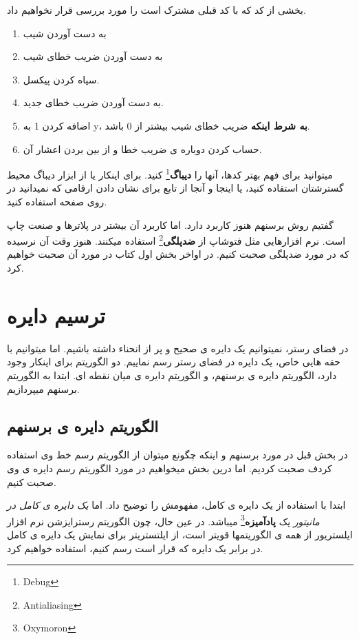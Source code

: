 \documentclass[14pt,a4paper]{memoir}
\begin{document}
	 
	 بخشی از کد که با کد قبلی مشترک است را مورد بررسی قرار نخواهیم داد.
	 
	\begin{enumerate}[label=(\Roman*)]
	\item  به دست آوردن شیب
	\item به دست آوردن ضریب خطای شیب
	\item سیاه کردن پیکسل.
	\item به دست آوردن ضریب خطای جدید.
	\item  اضافه کردن 1 به y، \textbf{به شرط اینکه} ضریب خطای شیب بیشتر از 0 باشد.
	\item  حساب کردن دوباره ی ضریب خطا و از بین بردن اعشار آن.
\end{enumerate}
	 
	 
	 \begin{tip}
	 	میتوانید برای فهم بهتر کدها، آنها را \textbf{دیباگ}\footnote{Debug} کنید. برای اینکار یا از ابزار دیباگ محیط گسترشتان استفاده کنید، یا اینجا و آنجا از تابع  برای نشان دادن ارقامی که نمیدانید در روی صفحه استفاده کنید.
	 \end{tip}
	 
	 
	 گفتیم روش برسنهم هنوز کاربرد دارد. اما کاربرد آن بیشتر در پلاترها و صنعت چاپ است. نرم افزارهایی مثل فتوشاپ از \textbf{ضدپلگی}\footnote{Antialiasing} استفاده میکنند. هنوز وقت آن نرسیده که در مورد ضدپلگی صحبت کنیم. در اواخر بخش اول کتاب در مورد آن صحبت خواهیم کرد. 
	 

	 
	 \section{ترسیم دایره}\label{circle}
	 در فضای رستر، نمیتوانیم یک دایره ی صحیح و پر از انحناء داشته باشیم. اما میتوانیم با حقه هایی خاص، یک دایره در فضای رستر رسم نماییم. دو الگوریتم برای اینکار وجود دارد، الگوریتم دایره ی برسنهم، و الگوریتم دایره ی میان نقطه ای. ابتدا به الگوریتم برسنهم میپردازیم.
	 
	 \subsection{الگوریتم دایره ی برسنهم}\label{bresenhamcircle}
	 
	 در بخش قبل در مورد برسنهم و اینکه چگونع میتوان از الگوریتم رسم خط وی استفاده کردف صحبت کردیم. اما درین بخش میخواهیم در مورد الگوریتم رسم دایره ی وی صحبت کنیم. 
	 
	 
	ابتدا با استفاده از یک دایره ی کامل، مفهومش را توضیح داد. اما \textit{یک دایره ی کامل در مانیتور} یک \textbf{پادآمیزه}\footnote{Oxymoron} میباشد. در عین حال، چون الگوریتم رسترایزشن نرم افزار ایلستریور از همه ی الگوریتمها قویتر است، از ایلتستریتر برای نمایش یک دایره ی کامل در برابر یک دایره که قرار است رسم کنیم، استفاده خواهیم کرد. 
	
\end{document}
